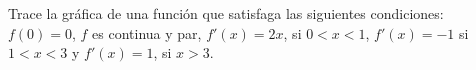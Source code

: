\item Trace la gráfica de una función que satisfaga las siguientes condiciones: $f(0) = 0$, $f$ es continua y par, $f'(x) = 2x$, si $0 < x < 1$, $f'(x) = -1$ si $1 < x < 3$ y $f'(x) = 1$, si $x > 3$.
